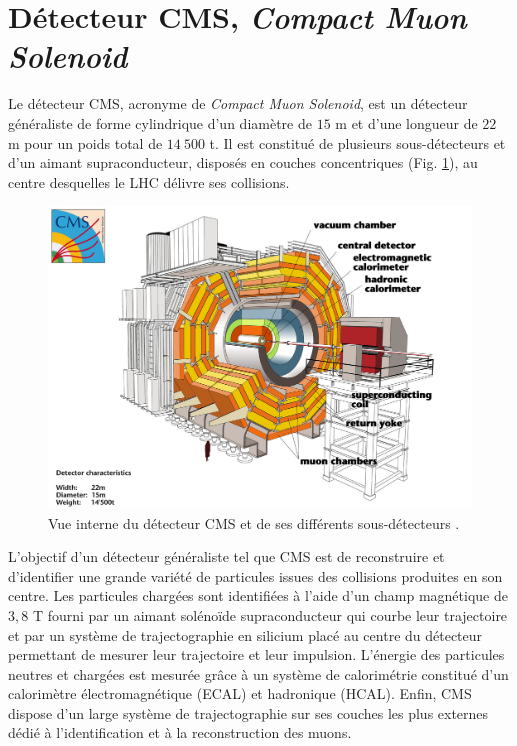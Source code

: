 \section{Détecteur CMS, \textit{\uppercase{C}ompact \uppercase{M}uon \uppercase{S}olenoid}}

Le détecteur CMS, acronyme de \textit{Compact Muon Solenoid}, est un détecteur généraliste de forme cylindrique d'un diamètre de $15$ m et d'une longueur de $22$ m pour un poids total de $14~500$ t. Il est constitué de plusieurs sous-détecteurs et d'un aimant supraconducteur, disposés en couches concentriques (Fig. \ref{cms}), au centre desquelles le LHC délivre ses collisions. \\

\begin{figure}
\centering
    \includegraphics[scale=0.5]{Chapitre3/Images/CMS.jpg} 
\caption{Vue interne du détecteur CMS et de ses différents sous-détecteurs \cite{CMSscheme}.}
\label{cms}
\end{figure}

L'objectif d'un détecteur généraliste tel que CMS est de reconstruire et d'identifier une grande variété de particules issues des collisions produites en son centre. Les particules chargées sont identifiées à l'aide d'un champ magnétique de $3,8$ T fourni par un aimant solénoïde supraconducteur qui courbe leur trajectoire et par un système de trajectographie en silicium placé au centre du détecteur permettant de mesurer leur trajectoire et leur impulsion. L'énergie des particules neutres et chargées est mesurée grâce à un système de calorimétrie constitué d'un calorimètre électromagnétique (ECAL) et hadronique (HCAL). Enfin, CMS dispose d'un large système de trajectographie sur ses couches les plus externes dédié à l'identification et à la reconstruction des muons. 

